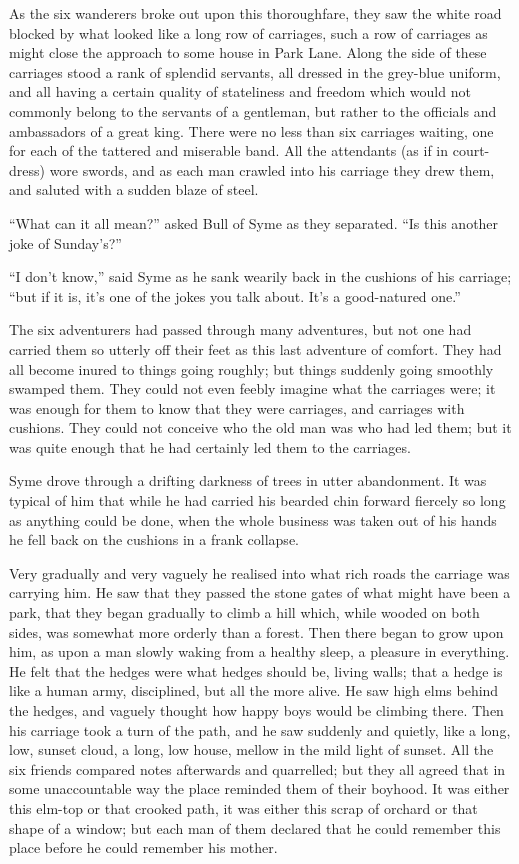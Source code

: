 As the six wanderers broke out upon this thoroughfare, they saw the white road blocked by what looked like a long row of carriages, such a row of carriages as might close the approach to some house in Park Lane. Along the side of these carriages stood a rank of splendid servants, all dressed in the grey-blue uniform, and all having a certain quality of stateliness and freedom which would not commonly belong to the servants of a gentleman, but rather to the officials and ambassadors of a great king. There were no less than six carriages waiting, one for each of the tattered and miserable band. All the attendants (as if in court-dress) wore swords, and as each man crawled into his carriage they drew them, and saluted with a sudden blaze of steel.

“What can it all mean?” asked Bull of Syme as they separated. “Is this another joke of Sunday’s?”

“I don’t know,” said Syme as he sank wearily back in the cushions of his carriage; “but if it is, it’s one of the jokes you talk about. It’s a good-natured one.”

The six adventurers had passed through many adventures, but not one had carried them so utterly off their feet as this last adventure of comfort. They had all become inured to things going roughly; but things suddenly going smoothly swamped them. They could not even feebly imagine what the carriages were; it was enough for them to know that they were carriages, and carriages with cushions. They could not conceive who the old man was who had led them; but it was quite enough that he had certainly led them to the carriages.

Syme drove through a drifting darkness of trees in utter abandonment. It was typical of him that while he had carried his bearded chin forward fiercely so long as anything could be done, when the whole business was taken out of his hands he fell back on the cushions in a frank collapse.

Very gradually and very vaguely he realised into what rich roads the carriage was carrying him. He saw that they passed the stone gates of what might have been a park, that they began gradually to climb a hill which, while wooded on both sides, was somewhat more orderly than a forest. Then there began to grow upon him, as upon a man slowly waking from a healthy sleep, a pleasure in everything. He felt that the hedges were what hedges should be, living walls; that a hedge is like a human army, disciplined, but all the more alive. He saw high elms behind the hedges, and vaguely thought how happy boys would be climbing there. Then his carriage took a turn of the path, and he saw suddenly and quietly, like a long, low, sunset cloud, a long, low house, mellow in the mild light of sunset. All the six friends compared notes afterwards and quarrelled; but they all agreed that in some unaccountable way the place reminded them of their boyhood. It was either this elm-top or that crooked path, it was either this scrap of orchard or that shape of a window; but each man of them declared that he could remember this place before he could remember his mother.

